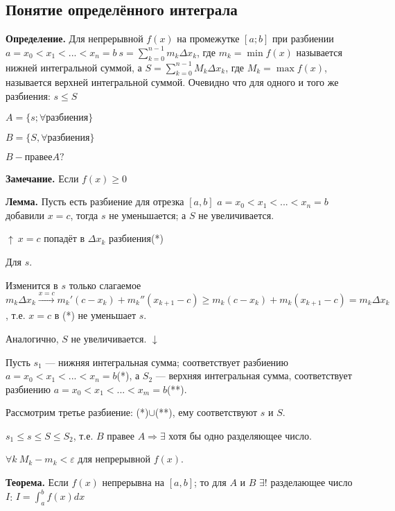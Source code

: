 \documentclass{article}
\begin{document}
\subsection{Понятие определённого интеграла}

\textbf{Определение.} Для непрерывной \(f(x)\) на промежутке \([a;b]\) при разбиении \(a = x_0 < x_1 < ... < x_n = b\ s = \sum_{k=0}^{n-1}m_k\Delta x_k\), где \(m_k = \min f(x)\) называется нижней интегральной суммой, а \(S = \sum_{k=0}^{n-1}M_k\Delta x_k\), где \(M_k = \max f(x)\), называется верхней интегральной суммой.
Очевидно что для одного и того же разбиения: \(s \leq S\)

\(A = \{s; \forall \textrm{разбиения}\}\)

\(B = \{S, \forall \textrm{разбиения}\}\)

\(B - \textrm{правее} A ?\)

\textbf{Замечание.} Если \(f(x) \geq 0\)


\textbf{Лемма.} Пусть есть разбиение для отрезка \([a,b]\)
\(a = x_0 < x_1 < ... < x_n = b \) добавили \(x = c\), тогда $s$ не уменьшается; а $S$ не увеличивается.

\(\uparrow\ x=c\) попадёт в \(\Delta x_k\) разбиения(*)

Для \(s\).

Изменится в \(s\) только слагаемое \(m_k\Delta x_k \xrightarrow[]{x=c} m_k'(c-x_k)+m_k''(x_{k+1}-c) \geq m_k(c-x_k)+m_k(x_{k+1}-c) = m_k\Delta x_k\), т.е. \(x=c\) в (*) не уменьшает \(s\).

Аналогично, $S$ не увеличивается. \(\downarrow\)


Пусть $s_1$ --- нижняя интегральная сумма; соответствует разбиению \(a = x_0 < x_1 < ... < x_n = b\)(*), а $S_2$ --- верхняя интегральная сумма, соответствует разбиению \(a = x_0 < x_1 < ... < x_m = b\)(**).

Рассмотрим третье разбиение: (*)\(\cup\)(**), ему соответствуют \(s\) и \(S\).

\(s_1 \leq s \leq S \leq S_2\), т.е. \(B\) правее \(A\Rightarrow \exists\) хотя бы одно разделяющее число.

\(\forall k\ M_k - m_k < \varepsilon\) для непрерывной \(f(x)\).

\textbf{Теорема.} Если $f(x)$ непрерывна на $[a,b]$; то для $A$ и $B$ $\exists!$ разделающее число $I$:
\( I = \int_a^b f(x)dx\)
\end{document}
